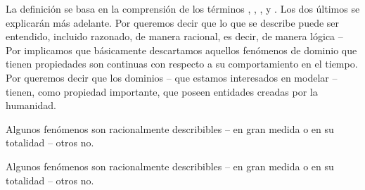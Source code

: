 \noindent
\mnewfoil%
\begynd
\pind La definición se basa en la comprensión de los términos \nyl
\pos{}{\vspace*{-10mm}\begin{multicols}{2}}
      , \nyl {}, \nyl {}, \nyl {} y \nyl {}.
\pos{}{\end{multicols}}
 Los dos últimos se explicarán más adelante.
\pind Por  queremos decir que lo que se describe \nyl
      puede ser entendido, incluido razonado, de manera racional, \nyl es decir,
      de manera lógica -- 
\pind Por  implicamos que básicamente descartamos
      aquellos fenómenos de dominio que tienen
      propiedades  son continuas con
      respecto a su comportamiento 
      en el tiempo.
\pind Por  queremos decir que los dominios -- que estamos
      interesados en modelar -- tienen, como propiedad importante, que
      poseen entidades creadas por la humanidad.
\afslut


\HHHH

\begynd
\pind {}

\noindent
\begynd
\pind Algunos fenómenos son racionalmente describibles -- en gran medida o en su totalidad -- otros no.
\afslut

\noindent
\begynd
\pind Algunos fenómenos son racionalmente describibles -- en gran medida o en su totalidad -- otros no.
\afslut

\noindent
\pind {}

